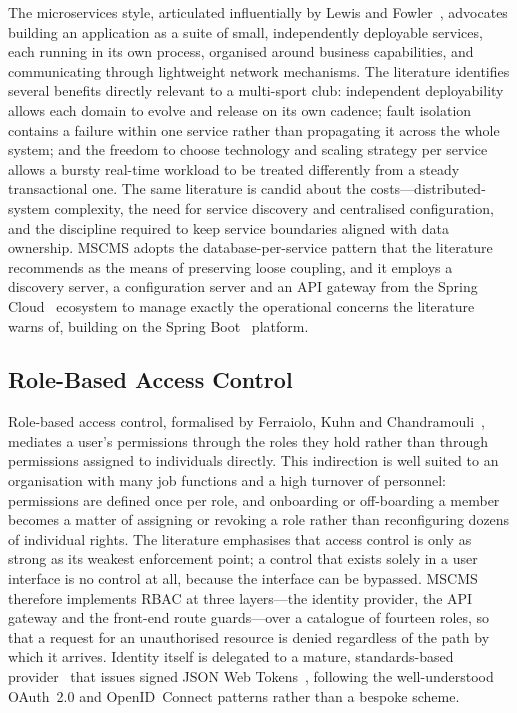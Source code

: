 The microservices style, articulated influentially by Lewis and Fowler~\cite{microservices},
advocates building an application as a suite of small, independently deployable services, each
running in its own process, organised around business capabilities, and communicating
through lightweight network mechanisms. The literature identifies several benefits directly
relevant to a multi-sport club: independent deployability allows each domain to evolve and
release on its own cadence; fault isolation contains a failure within one service rather than
propagating it across the whole system; and the freedom to choose technology and scaling
strategy per service allows a bursty real-time workload to be treated differently from a
steady transactional one. The same literature is candid about the costs---distributed-system
complexity, the need for service discovery and centralised configuration, and the discipline
required to keep service boundaries aligned with data ownership. MSCMS adopts the
database-per-service pattern that the literature recommends as the means of preserving loose
coupling, and it employs a discovery server, a configuration server and an API gateway from
the Spring Cloud~\cite{springcloud} ecosystem to manage exactly the operational concerns
the literature warns of, building on the Spring Boot~\cite{springboot} platform.

\subsection{Role-Based Access Control}
\label{subsec:lit-rbac}

Role-based access control, formalised by Ferraiolo, Kuhn and Chandramouli~\cite{rbac},
mediates a user's permissions through the roles they hold rather than through permissions
assigned to individuals directly. This indirection is well suited to an organisation with many
job functions and a high turnover of personnel: permissions are defined once per role, and
onboarding or off-boarding a member becomes a matter of assigning or revoking a role
rather than reconfiguring dozens of individual rights. The literature emphasises that access
control is only as strong as its weakest enforcement point; a control that exists solely in a
user interface is no control at all, because the interface can be bypassed. MSCMS therefore
implements RBAC at three layers---the identity provider, the API gateway and the front-end
route guards---over a catalogue of fourteen roles, so that a request for an unauthorised
resource is denied regardless of the path by which it arrives. Identity itself is delegated to a
mature, standards-based provider~\cite{keycloak} that issues signed JSON Web
Tokens~\cite{jwt}, following the well-understood OAuth~2.0 and OpenID~Connect patterns
rather than a bespoke scheme.

